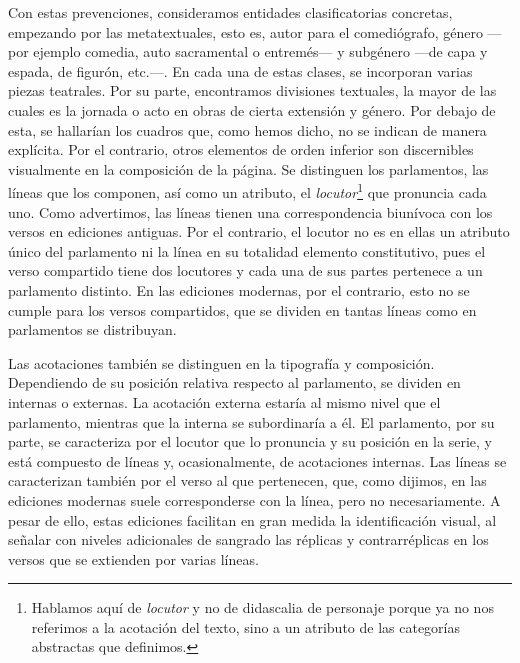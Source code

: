 Con estas prevenciones, consideramos entidades clasificatorias concretas, empezando por las metatextuales, esto es, autor para el comediógrafo, género —\nolinebreak por ejemplo comedia, auto sacramental o entremés\nolinebreak— y subgénero —\nolinebreak de capa y espada, de figurón, etc.\nolinebreak—\nolinebreak. En cada una de estas clases, se incorporan varias piezas teatrales. Por su parte, encontramos divisiones textuales, la mayor de las cuales es la jornada o acto en obras de cierta extensión y género. Por debajo de esta, se hallarían los cuadros que, como hemos dicho, no se indican de manera explícita. Por el contrario, otros elementos de orden inferior son discernibles visualmente en la composición de la página. Se distinguen los parlamentos, las líneas que los componen, así como un atributo, el \textit{locutor}\footnote{Hablamos aquí de \textit{locutor} y no de didascalia de personaje porque ya no nos referimos a la acotación del texto, sino a un atributo de las categorías abstractas que definimos.} que  pronuncia cada uno. Como advertimos, las líneas tienen una correspondencia biunívoca con los versos en ediciones antiguas. Por el contrario, el locutor no es en ellas un atributo único del parlamento ni la línea en su totalidad elemento constitutivo, pues el verso compartido tiene dos locutores y cada una de sus partes pertenece a un parlamento distinto. En las ediciones modernas, por el contrario, esto no se cumple para los versos compartidos, que se dividen en tantas líneas como en parlamentos se distribuyan. 

Las acotaciones también se distinguen en la tipografía y composición. Dependiendo de su posición relativa respecto al parlamento, se dividen en internas o externas. La acotación externa estaría al mismo nivel que el parlamento, mientras que la interna se subordinaría a él. El parlamento, por su parte, se caracteriza por el locutor que lo pronuncia y su posición en la serie, y está compuesto de líneas y, ocasionalmente, de acotaciones internas. Las líneas se caracterizan también por el verso al que pertenecen, que, como dijimos, en las ediciones modernas suele corresponderse con la línea, pero no necesariamente. A pesar de ello, estas ediciones facilitan en gran medida la identificación visual, al señalar con niveles adicionales de sangrado las réplicas y contrarréplicas en los versos que se extienden por varias líneas. 

